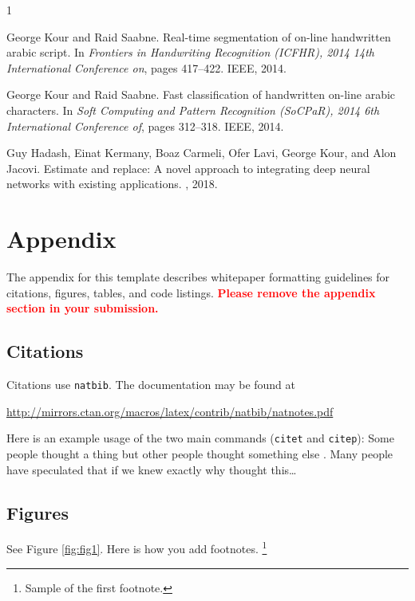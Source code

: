 \documentclass{article}
\begin{document}
\begin{thebibliography} {1}

George Kour and Raid Saabne.
\newblock Real-time segmentation of on-line handwritten arabic script.
\newblock In {\em Frontiers in Handwriting Recognition (ICFHR), 2014 14th
International Conference on}, pages 417--422. IEEE, 2014.

George Kour and Raid Saabne.
\newblock Fast classification of handwritten on-line arabic characters.
\newblock In {\em Soft Computing and Pattern Recognition (SoCPaR), 2014 6th
International Conference of}, pages 312--318. IEEE, 2014.

Guy Hadash, Einat Kermany, Boaz Carmeli, Ofer Lavi, George Kour, and Alon
Jacovi.
\newblock Estimate and replace: A novel approach to integrating deep neural
networks with existing applications.
, 2018.

\end{thebibliography}

\newpage

\section{Appendix}

The appendix for this template describes whitepaper formatting guidelines for citations, figures, tables, and code listings. \textbf{\textcolor{red}{Please remove the appendix section in your submission.}}

\subsection{Citations}
Citations use \verb+natbib+. The documentation may be found at
\begin{center}
	\url{http://mirrors.ctan.org/macros/latex/contrib/natbib/natnotes.pdf}
\end{center}

Here is an example usage of the two main commands (\verb+citet+ and \verb+citep+): Some people thought a thing \citep{kour2014real, hadash2018estimate} but other people thought something else \citep{kour2014fast}. Many people have speculated that if we knew exactly why \citet{kour2014fast} thought this\dots

\subsection{Figures}
\lipsum[10]
See Figure \ref{fig:fig1}. Here is how you add footnotes. \footnote{Sample of the first footnote.}
\lipsum[11]
\end{document}
